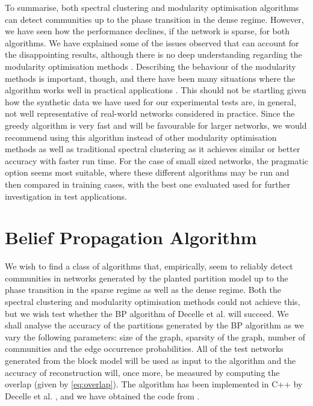 To summarise, both spectral clustering and modularity optimisation algorithms can detect communities up to the phase transition in the dense regime.
However, we have seen how the performance declines, if the network is sparse, for both algorithms.
We have explained some of the issues observed that can account for the disappointing results, although there is no deep understanding regarding the modularity optimisation methods \cite{For10}.
Describing the behaviour of the modularity methods is important, though, and there have been many situations where the algorithm works well in practical applications \cite{New06a,New06b,For10,GMC10}.
This should not be startling given how the synthetic data we have used for our experimental tests are, in general, not well representative of real-world networks considered in practice.
Since the greedy algorithm is very fast and will be favourable for larger networks, we would recommend using this algorithm instead of other modularity optimisation methods as well as traditional spectral clustering as it achieves similar or better accuracy with faster run time.
For the case of small sized networks, the pragmatic option seems most suitable, where these different algorithms may be run and then compared in training cases, with the best one evaluated used for further investigation in test applications.


\section{Belief Propagation Algorithm}
\label{sec:beliefPropagationAlgorithmTest}

We wish to find a class of algorithms that, empirically, seem to reliably detect communities in networks generated by the planted partition model up to the phase transition in the sparse regime as well as the dense regime.
Both the spectral clustering and modularity optimisation methods could not achieve this, but we wish test whether the BP algorithm of Decelle et al. \cite{DKM+13} will succeed.
We shall analyse the accuracy of the partitions generated by the BP algorithm as we vary the following parameters: size of the graph, sparsity of the graph, number of communities and the edge occurrence probabilities.
All of the test networks generated from the block model will be used as input to the algorithm and the accuracy of reconstruction will, once more, be measured by computing the overlap (given by \cref{eq:overlap}).
The algorithm has been implemented in C++ by Decelle et al. \cite{DKM+13}, and we have obtained the code from \cite{ModeNet}.


